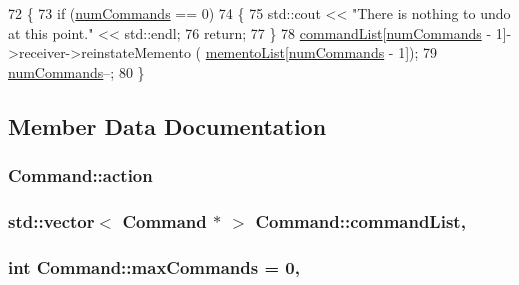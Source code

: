 \begin{DoxyCode}
72                            \{
73             \textcolor{keywordflow}{if} (\hyperlink{classCommand_a661b9cfc157529504ecf44528e4640b6}{numCommands} == 0)
74             \{
75                 std::cout << \textcolor{stringliteral}{"There is nothing to undo at this point."} << std::endl;
76                 \textcolor{keywordflow}{return};
77             \}
78             \hyperlink{classCommand_a3b694e6c1b5a3e62bdc0d7d1b3178eb1}{commandList}[\hyperlink{classCommand_a661b9cfc157529504ecf44528e4640b6}{numCommands} - 1]->receiver->reinstateMemento (
      \hyperlink{classCommand_a03c855537275970db8e4b9c7ea64a9f9}{mementoList}[\hyperlink{classCommand_a661b9cfc157529504ecf44528e4640b6}{numCommands} - 1]);
79             \hyperlink{classCommand_a661b9cfc157529504ecf44528e4640b6}{numCommands}--;
80         \}
\end{DoxyCode}


\subsection{Member Data Documentation}
\subsubsection[{\texorpdfstring{action}{action}}]{ Command\+::action\hspace{0.3cm}{\ttfamily [private]}}\hypertarget{classCommand_ac5473faf8b8b03ce83353838bc00c6dd}{}\label{classCommand_ac5473faf8b8b03ce83353838bc00c6dd}
\subsubsection[{\texorpdfstring{command\+List}{commandList}}]{\setlength{\rightskip}{0pt plus 5cm}std\+::vector$<$ {\bf Command} $\ast$ $>$ Command\+::command\+List\hspace{0.3cm}{\ttfamily [static]}, {\ttfamily [private]}}\hypertarget{classCommand_a3b694e6c1b5a3e62bdc0d7d1b3178eb1}{}\label{classCommand_a3b694e6c1b5a3e62bdc0d7d1b3178eb1}
\subsubsection[{\texorpdfstring{max\+Commands}{maxCommands}}]{\setlength{\rightskip}{0pt plus 5cm}int Command\+::max\+Commands = 0\hspace{0.3cm}{\ttfamily [static]}, {\ttfamily [private]}}\hypertarget{classCommand_a06f1310ccbfdcfd18cfae03dcb428728}{}\label{classCommand_a06f1310ccbfdcfd18cfae03dcb428728}

